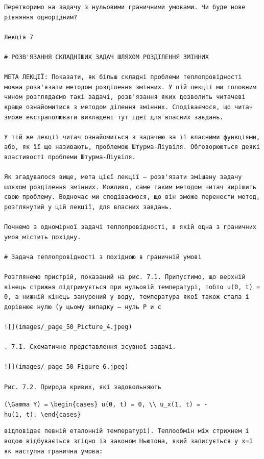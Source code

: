 \documentclass[
  ukrainian,
]{article}
\begin{document}
\begin{verbatim}
Перетворимо на задачу з нульовими граничними умовами. Чи буде нове рівняння однорідним?

Лекція 7

# РОЗВ'ЯЗАННЯ СКЛАДНІШИХ ЗАДАЧ ШЛЯХОМ РОЗДІЛЕННЯ ЗМІННИХ

МЕТА ЛЕКЦІЇ: Показати, як більш складні проблеми теплопровідності можна розв'язати методом розділення змінних. У цій лекції ми головним чином розглядаємо такі задачі, розв'язання яких дозволить читачеві краще ознайомитися з методом ділення змінних. Сподіваємося, що читач зможе екстраполювати викладені тут ідеї для власних завдань.

У тій же лекції читач ознайомиться з задачею за її власними функціями, або, як її ще називають, проблемою Штурма-Ліувіля. Обговорюються деякі властивості проблеми Штурма-Ліувіля.

Як згадувалося вище, мета цієї лекції — розв'язати змішану задачу шляхом розділення змінних. Можливо, саме таким методом читач вирішить свою проблему. Водночас ми сподіваємося, що він зможе перенести метод, розглянутий у цій лекції, для власних завдань.

Почнемо з одномірної задачі теплопровідності, в якій одна з граничних умов містить похідну.

# Задача теплопровідності з похідною в граничній умові

Розглянемо пристрій, показаний на рис. 7.1. Припустимо, що верхній кінець стрижня підтримується при нульовій температурі, тобто u(0, t) = 0, а нижній кінець занурений у воду, температура якої також стала і дорівнює нулю (у цьому випадку — нуль Р и с

![](images/_page_50_Picture_4.jpeg)

. 7.1. Схематичне представлення зсувної задачі.

![](images/_page_50_Figure_6.jpeg)

Рис. 7.2. Природа кривих, які задовольняють
\end{verbatim}

\texttt{(\textbackslash{}Gamma\ Y)\ =}
\texttt{\textbackslash{}begin\{cases\}\ u(0,\ t)\ =\ 0,\ \textbackslash{}\textbackslash{}\ u\_x(1,\ t)\ =\ -hu(1,\ t).\ \textbackslash{}end\{cases\}}

\begin{verbatim}
відповідає певній еталонній температурі). Теплообмін між стрижнем і водою відбувається згідно із законом Ньютона, який записується у x=1 як наступна гранична умова:
\end{verbatim}
\end{document}
